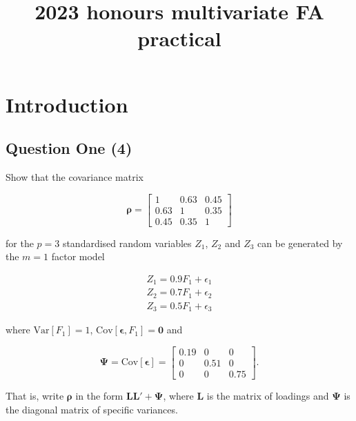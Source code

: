 \documentclass[
  letterpaper,
  DIV=11,
  numbers=noendperiod]{scrartcl}
\title{2023 honours multivariate FA practical}
\author{}
\date{}
\begin{document}
\maketitle
\ifdefined\Shaded\renewenvironment{Shaded}{\begin{tcolorbox}[boxrule=0pt, borderline west={3pt}{0pt}{shadecolor}, enhanced, breakable, interior hidden, frame hidden, sharp corners]}{\end{tcolorbox}}\fi

\hypertarget{introduction}{%
\section{Introduction}\label{introduction}}

\hypertarget{question-one-4}{%
\subsection{Question One (4)}\label{question-one-4}}

Show that the covariance matrix

\[
\mathbf{\rho} = 
\begin{bmatrix}
1 & 0.63 & 0.45 \\
0.63 & 1 & 0.35 \\
0.45 & 0.35 & 1 
\end{bmatrix}
\]

for the \(p=3\) standardised random variables \(Z_1\), \(Z_2\) and
\(Z_3\) can be generated by the \(m=1\) factor model

\[
\begin{align*}
Z_1 = 0.9F_1 + \epsilon_1 \\
Z_2 = 0.7F_1 + \epsilon_2 \\
Z_3 = 0.5F_1 + \epsilon_3
\end{align*}
\]

where \(\mathrm{Var}[F_1]=1\),
\(\mathrm{Cov}[\mathbf{\epsilon}, F_1]=\mathbf{0}\) and

\[
\mathbf{\Psi} = \mathrm{Cov}[\mathbf{\epsilon}] = 
\begin{bmatrix}
0.19 & 0 & 0 \\
0 & 0.51 & 0 \\
0 & 0 & 0.75 
\end{bmatrix}.
\]

That is, write \(\mathbf{\rho}\) in the form
\(\mathbf{L}\mathbf{L}' + \mathbf{\Psi}\), where \(\mathbf{L}\) is the
matrix of loadings and \(\mathbf{\Psi}\) is the diagonal matrix of
specific variances.
\end{document}
